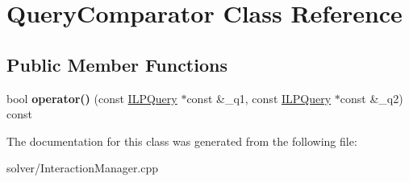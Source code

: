 \hypertarget{classQueryComparator}{\section{\-Query\-Comparator \-Class \-Reference}
\label{classQueryComparator}
}
\subsection*{\-Public \-Member \-Functions}
\begin{DoxyCompactItemize}
\item 
\hypertarget{classQueryComparator_a07bd1c21936f883c8f1870b5340c1f93}{bool {\bfseries operator()} (const \hyperlink{classILPQuery}{\-I\-L\-P\-Query} $\ast$const \&\-\_\-q1, const \hyperlink{classILPQuery}{\-I\-L\-P\-Query} $\ast$const \&\-\_\-q2) const }\label{classQueryComparator_a07bd1c21936f883c8f1870b5340c1f93}

\end{DoxyCompactItemize}


\-The documentation for this class was generated from the following file\-:\begin{DoxyCompactItemize}
\item 
solver/\-Interaction\-Manager.\-cpp\end{DoxyCompactItemize}
